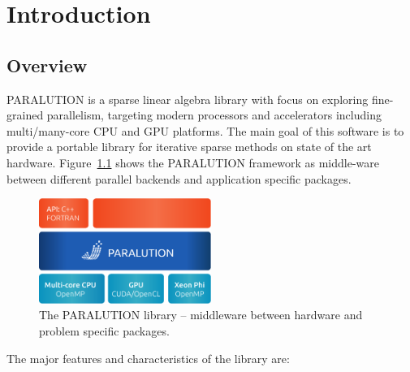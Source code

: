 \chapter{Introduction}

\section{Overview}


{PARALUTION} is a sparse linear algebra library with focus on exploring fine-grained parallelism, targeting modern processors and accelerators including multi/many-core CPU and GPU platforms. The main goal of this software is to provide a portable library for iterative sparse methods on state of the art hardware. Figure~\ref{paralution-lib-middleware} shows the {PARALUTION} framework as middle-ware between different parallel backends and application specific packages.
 
\begin{figure}[!ht]
\centering
\includegraphics[width=0.5\textwidth]{./fig/paralution-lib.pdf}
\caption{The {PARALUTION} library -- middleware between hardware and problem specific packages.}
\label{paralution-lib-middleware}
\end{figure}


The major features and characteristics of the library are: 

